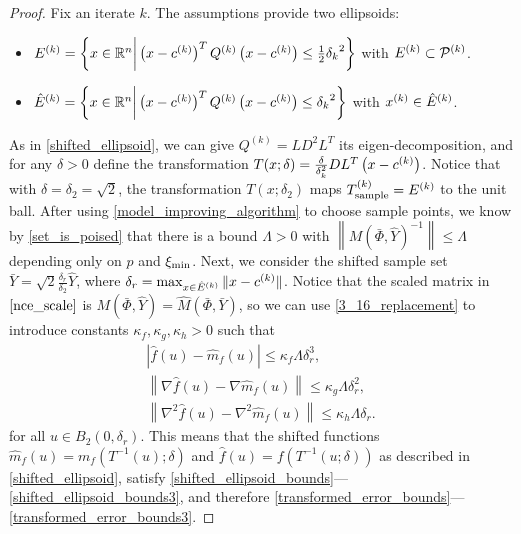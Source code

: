 \begin{proof}

Fix an iterate $k$.
The assumptions provide two ellipsoids:
\begin{itemize}
\item ${E^{(k)}} = \left\{x \in \mathbb R^n \bigg | \left(x - c^{(k)} \right)^T {Q^{(k)}} \left(x - c^{(k)}\right) \le \frac 1 2 {\delta_k}^2 \right\}$ with ${E^{(k)}} \subset {{\mathcal{P}}^{(k)}}$.
\item ${{\hat E}^{(k)}} = \left\{x \in \mathbb R^n \bigg | \left(x - c^{(k)}\right)^T {Q^{(k)}} \left(x - c^{(k)}\right) \le {\delta_k}^2 \right\}$ with $x^{(k)} \in {{\hat E}^{(k)}}$.
\end{itemize}
As in \cref{shifted_ellipsoid}, we can give $Q^{(k)} = LD^2L^T$ its eigen-decomposition, 
and for any $\delta > 0$ define the transformation $T(x; \delta) = \frac{\delta}{\delta_k^2} D L^T\left(x - c^{(k)}\right)$.
Notice that with $\delta = \delta_2 = \sqrt{2}$,
the transformation $T\left(x; \delta_2\right)$ maps ${T_{\text{sample}}^{(k)}} = {E^{(k)}}$ to the unit ball.
After using \cref{model_improving_algorithm} to choose sample points, we know by \cref{set_is_poised}
that there is a bound $\Lambda>0$ with $\left\| M\left(\bar \Phi, \hat Y\right)^{-1}\right\| \le \Lambda$ depending only on $p$ and $\xi_{\text{min}}$.
Next, we consider the shifted sample set $\bar Y = \sqrt{2}\frac{\delta_r}{\delta_2} \hat Y$, where $\delta_r = \max_{x \in {{\hat E}^{(k)}}}\|x - c^{(k)}\|$.
Notice that the scaled matrix in $\cref{nce_scale}$ is $M\left(\bar\Phi, \hat Y\right) = \hat M\left(\bar \Phi, \bar Y\right)$, so we can use \cref{3_16_replacement} to introduce constants $\kappa_f, \kappa_g, \kappa_h > 0$ such that
\begin{align*}
\left| \hat {f}\left(u\right) - \hat{m}_f\left(u\right) \right|\le \kappa_f\Lambda \delta_r^3, \\
\left\|\nabla \hat {f}\left(u\right) - \nabla \hat{m}_f\left(u\right) \right\|\le \kappa_g\Lambda \delta_r^2, \\
\left\|\nabla^2 \hat {f}\left(u\right) - \nabla^2 \hat{m}_f\left(u\right) \right\|\le \kappa_h\Lambda \delta_r.
\end{align*}
for all $u \in B_2\left(0, \delta_r\right)$.
This means that the shifted functions
$\hat {m}_f(u) = m_f(T^{-1}(u); \delta)$ and
$\hat f (u) = f(T^{-1}(u; \delta))$
as described in \cref{shifted_ellipsoid},
satisfy \cref{shifted_ellipsoid_bounds}---\cref{shifted_ellipsoid_bounds3},
and therefore \cref{transformed_error_bounds}---\cref{transformed_error_bounds3}.




\end{proof}
